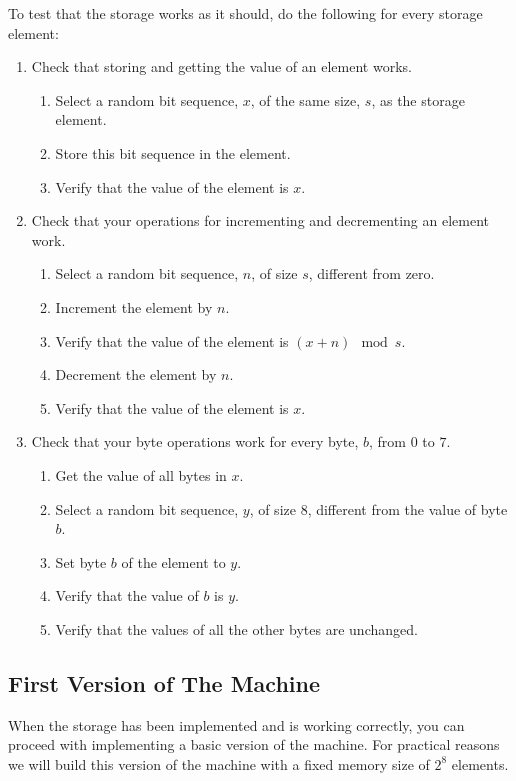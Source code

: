 \documentclass[a4paper,11pt]{article}
\begin{document}
To test that the storage works as it should, do the following for every storage element:
\begin{enumerate}
\item Check that storing and getting the value of an element works.
  \begin{enumerate}
  \item Select a random bit sequence, $x$, of the same size, $s$, as the storage element.
  \item Store this bit sequence in the element.
  \item Verify that the value of the element is $x$.
  \end{enumerate}
\item Check that your operations for incrementing and decrementing an element work.
  \begin{enumerate}
  \item Select a random bit sequence, $n$, of size $s$, different from zero.
  \item Increment the element by $n$.
  \item Verify that the value of the element is $(x + n) \mod s$.
  \item Decrement the element by $n$.
  \item Verify that the value of the element is $x$.
  \end{enumerate}
\item Check that your byte operations work for every byte, $b$, from $0$ to $7$.
  \begin{enumerate}
  \item Get the value of all bytes in $x$.
  \item Select a random bit sequence, $y$, of size $8$, different from the value of byte $b$.
  \item Set byte $b$ of the element to $y$.
  \item Verify that the value of $b$ is $y$.
  \item Verify that the values of all the other bytes are unchanged.
  \end{enumerate}
\end{enumerate}

\subsection{First Version of The Machine}

When the storage has been implemented and is working correctly, you can proceed with implementing a basic version of the machine.
For practical reasons we will build this version of the machine with a fixed memory size of $2^{8}$ elements.
\end{document}

